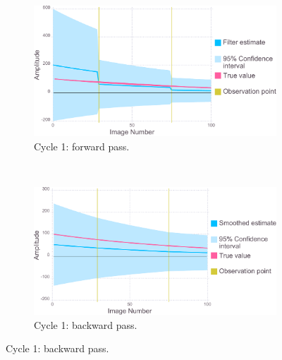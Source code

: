 \begin{figure}
	\centering
    \begin{subfigure}[b]{1.0\textwidth}
        \centering
        \includegraphics[width=\textwidth]{figures/datared/intDecSim_Filt1.pdf}
        \caption{Cycle 1: forward pass.}
        \label{fig:UKF simulation results - cycle 1 - good}
    \end{subfigure}
    \\
	\begin{subfigure}[b]{1.0\textwidth}
        \centering
        \includegraphics[width=\textwidth]{figures/datared/intDecSim1.pdf}
        \caption{Cycle 1: backward pass.}
        \label{fig:URTSS simulation results - cycle 1 - good}
    \end{subfigure}
\end{figure}
